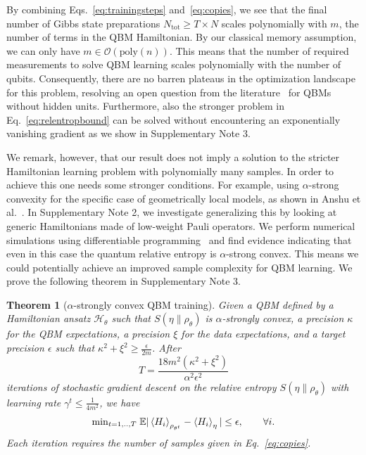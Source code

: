 \documentclass[
    reprint,
    aps,
    prx,
    longbibliography
]{revtex4-2}
\newtheorem{theorem}{Theorem}
\begin{document}
By combining Eqs.~\eqref{eq:trainingsteps} and~\eqref{eq:copies}, we see that the final number of Gibbs state preparations $N_{\mathrm{tot}}\geq T\times N$ scales polynomially with $m$, the number of terms in the QBM Hamiltonian. By our classical memory assumption, we can only have $m \in \mathcal{O}(\mathrm{poly}(n))$. This means that the number of required measurements to solve QBM learning scales polynomially with the number of qubits. Consequently, there are no barren plateaus in the optimization landscape for this problem, resolving an open question from the literature~\cite{Anschuetz_2022, Kieferova_2021} for QBMs without hidden units. Furthermore, also the stronger problem in Eq.~\eqref{eq:relentropbound} can be solved without encountering an exponentially vanishing gradient as we show in Supplementary Note 3. 

We remark, however, that our result does not imply a solution to the stricter Hamiltonian learning problem with polynomially many samples. In order to achieve this one needs some stronger conditions. For example, using $\alpha$-strong convexity for the specific case of geometrically local models, as shown in Anshu et al.~\cite{Anshu_2021}. 
In Supplementary Note 2, we investigate generalizing this by looking at generic Hamiltonians made of low-weight Pauli operators. We perform numerical simulations using differentiable programming~\cite{Baydin2017} and find evidence indicating that even in this case the quantum relative entropy is $\alpha$-strong convex. This means we could potentially achieve an improved sample complexity for QBM learning. We prove the following theorem in Supplementary Note 3.

\begin{theorem}[$\alpha$-strongly convex QBM training]
\label{thm:training_alpha}
Given a QBM defined by a Hamiltonian ansatz $\mathcal{H}_\theta$ such that $S(\eta\|\rho_\theta)$ is $\alpha$-strongly convex, a precision $\kappa$ for the QBM expectations, a precision $\xi$ for the data expectations, and a target precision $\epsilon$ such that $\kappa^2 + \xi^2 \geq \frac{\epsilon}{2m}$. After
\begin{equation}
    T =\frac{18 m^2 (\kappa^2 + \xi^2)}{\alpha^2\epsilon^2}
\end{equation}
iterations of stochastic gradient descent on the relative entropy $S(\eta \|\rho_\theta)$ with learning rate $\gamma^t \leq \frac{1}{4m^2}$, we have
\begin{equation}
    \mathrm{min}_{t=1,..,T} \; \mathbb{E}| \expval{H_i}_{\rho_{\theta^t}}  - \expval{H_i}_\eta | \leq \epsilon, \qquad \forall i.
\end{equation} 
Each iteration requires the number of samples given in Eq.~\eqref{eq:copies}. 
\end{theorem}
\end{document}
